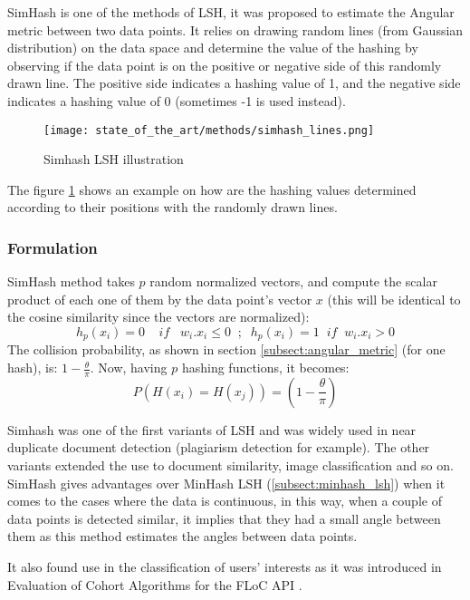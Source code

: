 SimHash is one of the methods of LSH, it was proposed to estimate the Angular
metric between two data points. It relies on drawing random lines (from Gaussian
distribution) on the data space and determine the value of the hashing by
observing if the data point is on the positive or negative side of this randomly
drawn line. The positive side indicates a hashing value of 1, and the negative
side indicates a hashing value of 0 (sometimes -1 is used instead).

\begin{figure}[h]
    \centering
    \texttt{[image: state\_of\_the\_art/methods/simhash\_lines.png]}
    \caption{Simhash LSH illustration}
    \label{fig:simhash_lines}
\end{figure}

The figure \ref{fig:simhash_lines} shows an example on how are the hashing
values determined according to their positions with the randomly drawn lines.

\subsubsection{Formulation}
SimHash method takes $p$ random normalized vectors, and compute the scalar
product of each one of them by the data point's vector $x$ (this will be
identical to the cosine similarity since the vectors are normalized):
$$
    h_p(x_i) = 0 \; \; \; \; if \; \; \; w_i . x_i \leq 0 \; \; ; \; \; h_p(x_i) = 1 \; \; if \; \; w_i . x_i > 0
$$
The collision probability, as shown in section \ref{subsect:angular_metric}
(for one hash), is: $1 -\frac{\theta}{\pi}$. Now, having $p$ hashing functions, it becomes:
$$
    P(H(x_i) = H(x_j) ) = (1 - \frac{\theta}{\pi})
$$

Simhash was one of the first variants of LSH and was widely used in near
duplicate document detection (plagiarism detection for example). The other
variants extended the use to document similarity, image classification and so
on. SimHash gives advantages over MinHash LSH (\ref{subsect:minhash_lsh}) when
it comes to the cases where the data is continuous, in this way, when a couple
of data points is detected similar, it implies that they had a small angle
between them as this method estimates the angles between data points.

It also found use in the classification of users' interests as it was introduced
in Evaluation of Cohort Algorithms for the FLoC API \citep{google_floc_2020}.



